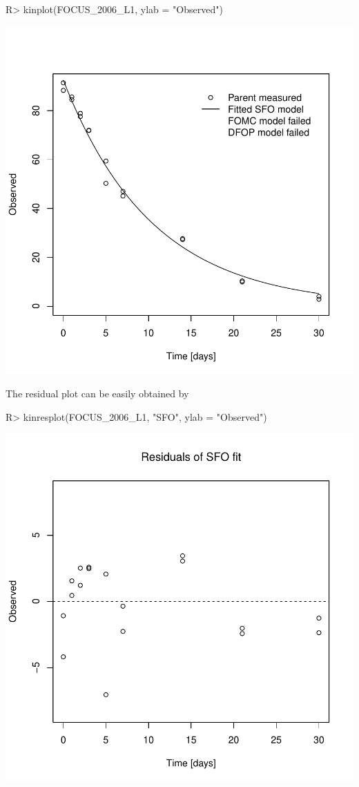 \documentclass[12pt,a4paper]{article}
\begin{document}
\begin{Schunk}
\begin{Sinput}
R> kinplot(FOCUS_2006_L1, ylab = "Observed")
\end{Sinput}
\end{Schunk}
\includegraphics{examples-L1_SFO_plot}

The residual plot can be easily obtained by

\begin{Schunk}
\begin{Sinput}
R> kinresplot(FOCUS_2006_L1, "SFO", ylab = "Observed")
\end{Sinput}
\end{Schunk}
\includegraphics{examples-L1_SFO_residuals}
\end{document}
